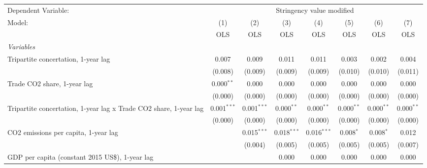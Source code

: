 
\begingroup
\centering
\begin{tabular}{lccccccc}
   \toprule
   Dependent Variable: & \multicolumn{7}{c}{Stringency value modified}\\
   Model:                                                            & (1)           & (2)           & (3)           & (4)           & (5)          & (6)          & (7)\\  
                                                                     &  OLS          & OLS           & OLS           & OLS           & OLS          & OLS          & OLS\\  
   \midrule
   \emph{Variables}\\
   Tripartite concertation, 1-year lag                               & 0.007         & 0.009         & 0.011         & 0.011         & 0.003        & 0.002        & 0.004\\   
                                                                     & (0.008)       & (0.009)       & (0.009)       & (0.009)       & (0.010)      & (0.010)      & (0.011)\\   
   Trade CO2 share, 1-year lag                                       & 0.000$^{**}$  & 0.000         & 0.000         & 0.000         & 0.000        & 0.000        & 0.000\\   
                                                                     & (0.000)       & (0.000)       & (0.000)       & (0.000)       & (0.000)      & (0.000)      & (0.000)\\   
   Tripartite concertation, 1-year lag x Trade CO2 share, 1-year lag & 0.001$^{***}$ & 0.001$^{***}$ & 0.000$^{**}$  & 0.000$^{**}$  & 0.000$^{**}$ & 0.000$^{**}$ & 0.000$^{**}$\\   
                                                                     & (0.000)       & (0.000)       & (0.000)       & (0.000)       & (0.000)      & (0.000)      & (0.000)\\   
   CO2 emissions per capita, 1-year lag                              &               & 0.015$^{***}$ & 0.018$^{***}$ & 0.016$^{***}$ & 0.008$^{*}$  & 0.008$^{*}$  & 0.012\\   
                                                                     &               & (0.004)       & (0.005)       & (0.005)       & (0.005)      & (0.005)      & (0.007)\\   
   GDP per capita (constant 2015 US\$), 1-year lag                   &               &               & 0.000         & 0.000         & 0.000        & 0.000        & 0.000\\   

\end{tabular}
